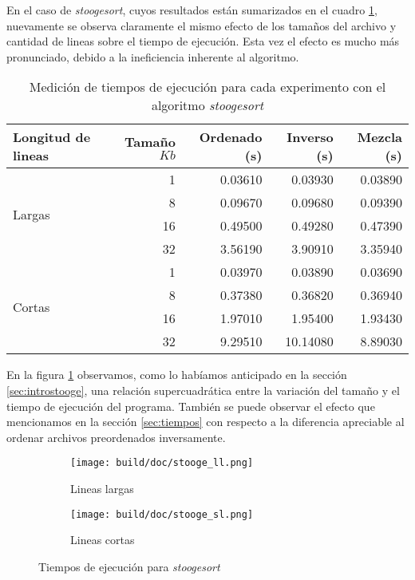 \documentclass[a4paper,11pt]{article}
\begin{document}
\FloatBarrier

En el caso de \textit{stoogesort}, cuyos resultados están sumarizados en el
cuadro \ref{tab:medicionesstooge}, nuevamente se observa claramente el mismo
efecto de los tamaños del archivo y cantidad de lineas sobre el tiempo de
ejecución. Esta vez el efecto es mucho más pronunciado, debido a la
ineficiencia inherente al algoritmo.

\begin{table}[h!]
\centering
\begin{tabular}{ | l | r | r | r |r | }
  \hline
  Longitud de lineas            & Tamaño \(Kb\) & Ordenado (s) & Inverso (s) & Mezcla (s) \\ \hline
   \multirow{4}{*}{Largas}      & 1             & 0.03610      & 0.03930     & 0.03890 \\
                                & 8             & 0.09670      & 0.09680     & 0.09390 \\
                                & 16            & 0.49500      & 0.49280     & 0.47390 \\
                                & 32            & 3.56190      & 3.90910     & 3.35940 \\ \hline
  \multirow{4}{*}{Cortas}       & 1             & 0.03970      & 0.03890     & 0.03690 \\
                                & 8             & 0.37380      & 0.36820     & 0.36940 \\
                                & 16            & 1.97010      & 1.95400     & 1.93430 \\
                                & 32            & 9.29510      & 10.14080    & 8.89030 \\
  \hline
\end{tabular}
\caption{Medición de tiempos de ejecución para cada experimento con el algoritmo \textit{stoogesort}}
\label{tab:medicionesstooge}
\end{table}

En la figura \ref{fig:medicionesstooge} observamos, como lo habíamos anticipado
en la sección \ref{sec:introstooge}, una relación supercuadrática entre la
variación del tamaño y el tiempo de ejecución del programa. También se puede
observar el efecto que mencionamos en la sección \ref{sec:tiempos} con respecto
a la diferencia apreciable al ordenar archivos preordenados inversamente.

\begin{figure}
  \begin{subfigure}[b]{\textwidth}
    \centering
    \texttt{[image: build/doc/stooge\_ll.png]}
    \caption{Lineas largas}
  \end{subfigure}%

  \begin{subfigure}[b]{\textwidth}
    \centering
    \texttt{[image: build/doc/stooge\_sl.png]}
    \caption{Lineas cortas}
  \end{subfigure}
  \caption{Tiempos de ejecución para \textit{stoogesort}}\label{fig:medicionesstooge}
\end{figure}
\end{document}
